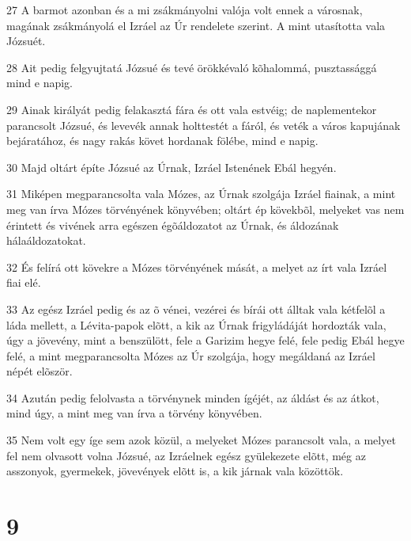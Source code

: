 \par 27 A barmot azonban és a mi zsákmányolni valója volt ennek a városnak, magának zsákmányolá el Izráel az Úr rendelete szerint. A mint utasította vala Józsuét.
\par 28 Ait pedig felgyujtatá Józsué és tevé örökkévaló kõhalommá, pusztassággá mind e napig.
\par 29 Ainak királyát pedig felakasztá fára és ott vala estvéig; de naplementekor parancsolt Józsué, és levevék annak holttestét a fáról, és veték a város kapujának bejáratához, és nagy rakás követ hordanak fölébe, mind e napig.
\par 30 Majd oltárt építe Józsué az Úrnak, Izráel Istenének Ebál hegyén.
\par 31 Miképen megparancsolta vala Mózes, az Úrnak szolgája Izráel fiainak, a mint meg van írva Mózes törvényének könyvében; oltárt ép kövekbõl, melyeket vas nem érintett és vivének arra egészen égõáldozatot az Úrnak, és áldozának  hálaáldozatokat.
\par 32 És felírá ott kövekre a Mózes törvényének mását, a melyet az írt vala Izráel fiai elé.
\par 33 Az egész Izráel pedig és az õ vénei, vezérei és bírái ott álltak vala kétfelõl a láda mellett, a Lévita-papok elõtt, a kik az Úrnak frigyládáját hordozták vala, úgy a jövevény, mint a benszülött, fele a Garizim hegye felé, fele pedig Ebál hegye felé, a mint megparancsolta Mózes az Úr szolgája, hogy megáldaná az Izráel népét elõször.
\par 34 Azután pedig felolvasta a törvénynek minden ígéjét, az áldást és az átkot, mind úgy, a mint meg van írva a törvény könyvében.
\par 35 Nem volt egy íge sem azok közül, a melyeket Mózes parancsolt vala, a melyet fel nem olvasott volna Józsué, az Izráelnek egész gyülekezete elõtt, még az asszonyok, gyermekek, jövevények elõtt is, a kik járnak vala közöttök.

\chapter{9}

